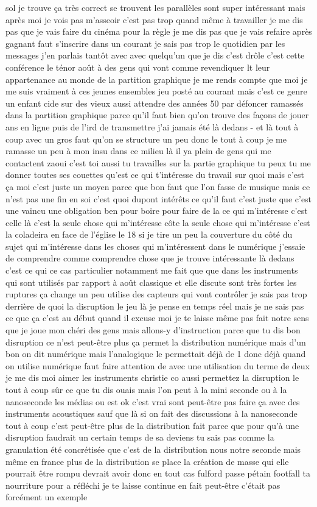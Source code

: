sol je trouve ça très correct se trouvent les parallèles sont super intéressant mais après moi je vois pas m'asseoir c'est pas trop quand même à travailler je me dis pas que je vais faire du cinéma pour la règle je me dis pas que je vais refaire après gagnant faut s'inscrire dans un courant je sais pas trop le quotidien par les messages j'en parlais tantôt avec avec quelqu'un que je dis c'est drôle c'est cette conférence le ténor août à des gens qui vont comme revendiquer lt leur appartenance au monde de la partition graphique je me rends compte que moi je me suis vraiment à ces jeunes ensembles jeu posté au courant mais c'est ce genre un enfant cide sur des vieux aussi attendre des années 50 par défoncer ramassés dans la partition graphique parce qu'il faut bien qu'on trouve des façons de jouer ans en ligne puis de l'ird de transmettre j'ai jamais été là dedans - et là tout à coup avec un gros faut qu'on se structure un peu donc le tout à coup je me ramasse un peu à mon insu dans ce milieu là il ya plein de gens qui me contactent zaoui c'est toi aussi tu travailles sur la partie graphique tu peux tu me donner toutes ses couettes qu'est ce qui t'intéresse du travail sur quoi mais c'est ça moi c'est juste un moyen parce que bon faut que l'on fasse de musique mais ce n'est pas une fin en soi c'est quoi dupont intérêts ce qu'il faut c'est juste que c'est une vaincu une obligation ben pour boire pour faire de la ce qui m'intéresse c'est celle là c'est la seule chose qui m'intéresse côte la seule chose qui m'intéresse c'est la coladeira en face de l'église le 18 si je tire un peu la couverture du côté du sujet qui m'intéresse dans les choses qui m'intéressent dans le numérique j'essaie de comprendre comme comprendre chose que je trouve intéressante là dedans c'est ce qui ce cas particulier notamment me fait que que dans les instruments qui sont utilisés par rapport à août classique et elle discute sont très fortes les ruptures ça change un peu utilise des capteurs qui vont contrôler je sais pas trop derrière de quoi la disruption le jeu là je pense en temps réel mais je ne sais pas ce que ça c'est au début quand il excuse moi je te laisse même pas fait notre sens que je joue mon chéri des gens mais allons-y d'instruction parce que tu dis bon disruption ce n'est peut-être plus ça permet la distribution numérique mais d'un bon on dit numérique mais l'analogique le permettait déjà de 1 donc déjà quand on utilise numérique faut faire attention de avec une utilisation du terme de deux je me dis moi aimer les instruments christie co aussi permettez la disruption le tout à coup sûr ce que tu dis ouais mais l'on peut à la mini seconde ou à la nanoseconde les médias ou est ok c'est vrai sont peut-être pas faire ça avec des instruments acoustiques sauf que là si on fait des discussions à la nanoseconde tout à coup c'est peut-être plus de la distribution fait parce que pour qu'à une disruption faudrait un certain temps de sa deviens tu sais pas comme la granulation été concrétisée que c'est de la distribution nous notre seconde mais même en france plus de la distribution se place la création de masse qui elle pourrait être rompu devrait avoir donc en tout cas fulford passe pétain footfall ta nourriture pour a réfléchi je te laisse continue en fait peut-être c'était pas forcément un exemple 
